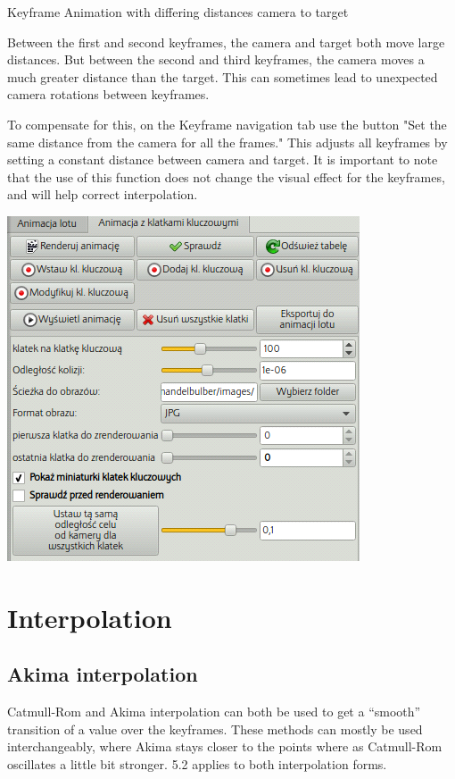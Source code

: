 Keyframe Animation with differing distances camera to target

Between the first and second keyframes, the camera and target both move large
distances. But between the second and third keyframes, the camera moves a much
greater distance than the target. This can sometimes lead to unexpected camera
rotations between keyframes.

To compensate for this, on the Keyframe navigation tab use the button "Set the
same distance from the camera for all the frames." This adjusts all keyframes by
setting a constant distance between camera and target. It is important to note
that the use of this function does not change the visual effect for the
keyframes, and will help correct interpolation.

\includegraphics[width=4.11597in,height=4.02292in]{img/manual/media/image19.png}

\section{Interpolation}\label{interpolation}

\subsection{Akima interpolation}\label{akima-interpolation}

Catmull-Rom and Akima interpolation can both be used to get a ``smooth''
transition of a value over the keyframes. These methods can mostly be used
interchangeably, where Akima stays closer to the points where as Catmull-Rom
oscillates a little bit stronger. 5.2 applies to both interpolation forms.

